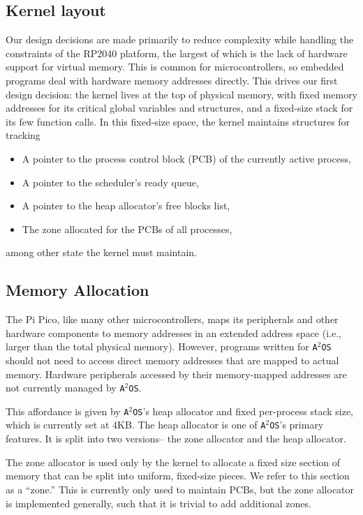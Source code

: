 \documentclass[12pt]{article}
\newcommand{\os}{\texttt{A$^2$OS} }
\newcommand{\osns}{\texttt{A$^2$OS}}
\begin{document}
\subsection{Kernel layout}
Our design decisions are made primarily to reduce complexity while handling the
constraints of the RP2040 platform, the largest of which is the lack of hardware
support for virtual memory. This is common for microcontrollers, so embedded
programs deal with hardware memory addresses directly. This drives our first
design decision: the kernel lives at the top of physical memory, with fixed
memory addresses for its critical global variables and structures, and a
fixed-size stack for its few function calls. In this fixed-size space, the
kernel maintains structures for tracking
\begin{itemize}
    \item {A pointer to the process control block (PCB) of the currently active
    process,}
    \item A pointer to the scheduler's ready queue,
    \item A pointer to the heap allocator's free blocks list,
    \item The zone allocated for the PCBs of all processes,
\end{itemize}
among other state the kernel must maintain.

\subsection{Memory Allocation}
The Pi Pico, like
many other microcontrollers, maps its peripherals and other hardware components
to memory addresses in an extended address space (i.e., larger than the total
physical memory). However, programs written for \os should not need to access
direct memory addresses that are mapped to actual memory. Hardware peripherals
accessed by their memory-mapped addresses are not currently managed by \osns.

This affordance is given by \osns's heap allocator and fixed per-process stack
size, which is currently set at 4KB. The heap allocator is one of \osns's
primary features. It is split into two versions-- the zone allocator and the
heap allocator.

The zone allocator is used only by the kernel to allocate a fixed size section
of memory that can be split into uniform, fixed-size pieces. We refer to this
section as a ``zone.'' This is currently only used to maintain PCBs, but the
zone allocator is implemented generally, such that it is trivial to add
additional zones.
\end{document}
